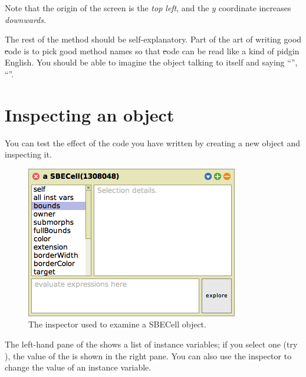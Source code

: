 \documentclass[a4paper,10pt,twoside]{book}
\begin{document}
Note that the origin of the \sq screen is the \emph{top left}, and the $y$ coordinate increases \emph{downwards}.

The rest of the method should be self-explanatory.
Part of the art of writing good \st code is to pick good method names so that \st code can be read like a kind of pidgin English.
You should be able to imagine the object talking to itself and saying ``'', ``''.

\section{Inspecting an object}

You can test the effect of the code you have written by creating a new  object and inspecting it.


\begin{figure}[htbp]
   \centering
   \includegraphics[scale=0.7]{SBECellInspector} 
   \caption{The inspector used to examine a SBECell object.\label{fig:SBECellInspector}}
\end{figure}

The left-hand pane of the  shows a list of instance variables; if you select one (try \mbox{),} the value of the  is shown in the right pane.  You can also use the inspector to change the value of an instance variable.
\end{document}
